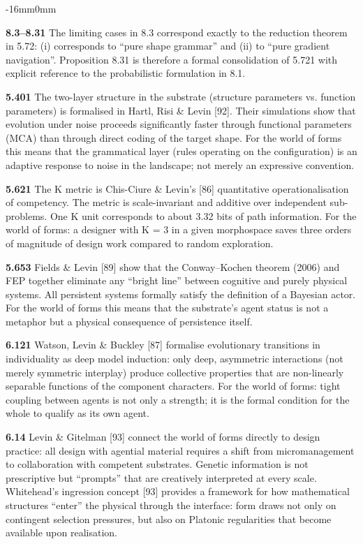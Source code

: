 \documentclass[10pt,oneside]{book}
\newenvironment{widebody}{%
  \begin{adjustwidth}{-16mm}{0mm}%
}{%
  \end{adjustwidth}%
}
\begin{document}
\begin{widebody}
{\textbf{8.3--8.31} The limiting cases in 8.3 correspond exactly to the reduction theorem in 5.72: (i) corresponds to ``pure shape grammar'' and (ii) to ``pure gradient navigation''. Proposition 8.31 is therefore a formal consolidation of 5.721 with explicit reference to the probabilistic formulation in 8.1.

\textbf{5.401} The two-layer structure in the substrate (structure parameters vs. function parameters) is formalised in Hartl, Risi \& Levin [92]. Their simulations show that evolution under noise proceeds significantly faster through functional parameters (MCA) than through direct coding of the target shape. For the world of forms this means that the grammatical layer (rules operating on the configuration) is an adaptive response to noise in the landscape; not merely an expressive convention.

\textbf{5.621} The K metric is Chis-Ciure \& Levin's [86] quantitative operationalisation of competency. The metric is scale-invariant and additive over independent sub-problems. One K unit corresponds to about 3.32 bits of path information. For the world of forms: a designer with K = 3 in a given morphospace saves three orders of magnitude of design work compared to random exploration.

\textbf{5.653} Fields \& Levin [89] show that the Conway--Kochen theorem (2006) and FEP together eliminate any ``bright line'' between cognitive and purely physical systems. All persistent systems formally satisfy the definition of a Bayesian actor. For the world of forms this means that the substrate's agent status is not a metaphor but a physical consequence of persistence itself.

\textbf{6.121} Watson, Levin \& Buckley [87] formalise evolutionary transitions in individuality as deep model induction: only deep, asymmetric interactions (not merely symmetric interplay) produce collective properties that are non-linearly separable functions of the component characters. For the world of forms: tight coupling between agents is not only a strength; it is the formal condition for the whole to qualify as its own agent.

\textbf{6.14} Levin \& Gitelman [93] connect the world of forms directly to design practice: all design with agential material requires a shift from micromanagement to collaboration with competent substrates. Genetic information is not prescriptive but ``prompts'' that are creatively interpreted at every scale. Whitehead's ingression concept [93] provides a framework for how mathematical structures ``enter'' the physical through the interface: form draws not only on contingent selection pressures, but also on Platonic regularities that become available upon realisation.

}
\end{widebody}
\end{document}
